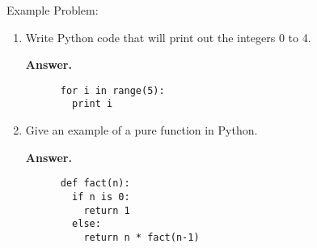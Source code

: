 \documentclass[10pt]{article}
\begin{document}
Example Problem:
\begin{enumerate}
  \item
    Write Python code that will print out the integers 0 to 4.

    \textbf{Answer.}
    \lstset{language=Python}
    \begin{lstlisting}
      for i in range(5):
        print i
    \end{lstlisting}
  \item
    Give an example of a pure function in Python.

    \textbf{Answer.}
    \begin{lstlisting}
      def fact(n):
        if n is 0:
          return 1
        else:
          return n * fact(n-1)
    \end{lstlisting}

\end{enumerate}
\end{document}
